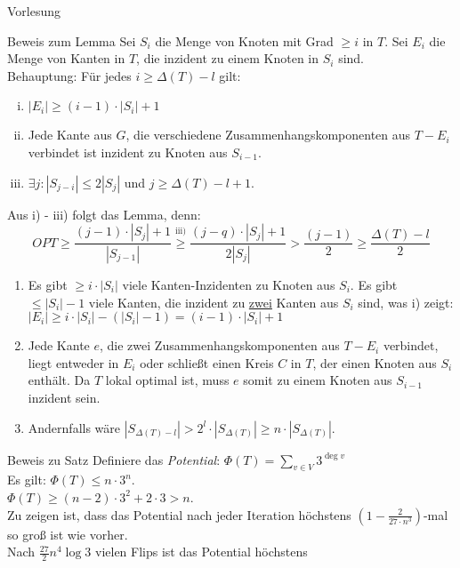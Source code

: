 \begin{section}{Vorlesung}
 \begin{subsection}{Beweis zum Lemma}
  Sei $S_i$ die Menge von Knoten mit Grad $\geq i$ in $T$. Sei $E_i$ die Menge von Kanten in $T$, die inzident zu einem Knoten in $S_i$ sind. \\
  Behauptung: Für jedes $i \geq \Delta(T)-l$ gilt:
  \begin{enumerate}[i)]
   \item $|E_i| \geq (i-1)\cdot |S_i| +1$
   \item Jede Kante aus $G$, die verschiedene Zusammenhangskomponenten aus $T - E_i$ verbindet ist inzident zu Knoten aus $S_{i-1}$.
   \item $\exists j: |S_{j-i}| \leq 2|S_j|$ und $j \geq \Delta(T) - l + 1$.
  \end{enumerate}
  Aus i) - iii) folgt das Lemma, denn:\\
  \[OPT \geq \frac{(j-1)\cdot |S_j|+1}{|S_{j-1}|} \overset{\text{iii)}}{\geq} \frac{(j-q)\cdot |S_j|+1}{2|S_j|} > \frac{(j-1)}{2} \geq \frac{\Delta(T)-l}{2}\]
  \begin{enumerate}[zu i)]
   \item Es gibt $\geq i \cdot |S_i|$ viele Kanten-Inzidenten zu Knoten aus $S_i$. Es gibt $\leq |S_i|-1$ viele Kanten, die inzident zu \underline{zwei} Kanten aus $S_i$ sind, was i) zeigt:
   $|E_i| \geq i \cdot |S_i| - (|S_i|-1) = (i-1) \cdot |S_i| +1$
   \item Jede Kante $e$, die zwei Zusammenhangskomponenten aus $T-E_i$ verbindet, liegt entweder in $E_i$ oder schließt einen Kreis $C$ in $T$, der einen Knoten aus $S_i$ enthält. Da $T$ lokal optimal ist, muss $e$ somit zu einem Knoten aus $S_{i-1}$ inzident sein.
   \item Andernfalls wäre $|S_{\Delta(T)-l}| > 2^l \cdot |S_{\Delta(T)}| \geq n \cdot |S_{\Delta(T)}|$.
  \end{enumerate}
 \end{subsection}
 \begin{subsection}{Beweis zu Satz}
  Definiere das \textit{Potential}: $\Phi(T) = \sum_{v\in V} 3^{\deg v}$\\
  Es gilt: $\Phi(T) \leq n \cdot 3^n$.\\
  $\Phi(T) \geq (n-2)\cdot 3^2 + 2 \cdot 3 > n$.\\
  Zu zeigen ist, dass das Potential nach jeder Iteration höchstens $(1- \frac{2}{27\cdot n^3})$-mal so groß ist wie vorher.\\
  Nach $\frac{27}{2} n^4 \log 3$ vielen Flips ist das Potential höchstens \\

\end{subsection}
\end{section}
